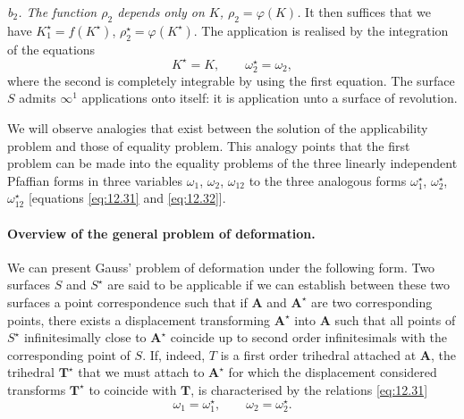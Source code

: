 \documentclass[leqno,11pt]{book}
\makeatletter
\numberwithin{equation}{chapter}
\theoremstyle{shape1}
\theoremstyle{shapesmall}
\let\old@phi\phi
\let\old@varphi\varphi
\let\phi\old@varphi
\let\varphi\old@phi
\newcommand{\str}{^{\star}}
\newcommand{\somespace}{\vspace{9pt}}
\makeatother
\begin{document}
\somespace

\emph{b$_{2}$. The function $\rho_{2}$ depends only on $K$, $\rho_{2}=\phi(K)$.}
It then suffices that we have $K\str_{1}=f(K\str)$, $\rho\str_{2}=\phi(K\str)$. The application is realised by the integration of the equations
\[
K\str=K,\qquad\omega\str_{2}=\omega_{2},
\]
where the second is completely integrable by using the first equation. The surface $S$ admits $\infty^{1}$ applications onto itself: it is application unto a surface of revolution.

\somespace

We will observe analogies that exist between the solution of the applicability problem and those of equality problem. This analogy points that the first problem can be made into the equality problems of the three linearly independent Pfaffian forms in three variables $\omega_{1}$, $\omega_{2}$, $\omega_{12}$ to the three analogous forms $\omega\str_{1}$, $\omega\str_{2}$, $\omega\str_{12}$ [equations \eqref{eq:12.31} and \eqref{eq:12.32}].

\paragraph{Overview of the general problem of deformation.}
\label{sec:196}
We can present Gauss' problem of deformation under the following form. Two surfaces $S$ and $S\str$ are said to be applicable if we can establish between these two surfaces a point correspondence such that if $\mathbf{A}$ and $\mathbf{A}\str$ are two corresponding points, there exists a displacement transforming $\mathbf{A}\str$ into $\mathbf{A}$ such that all points of $S\str$ infinitesimally close to $\mathbf{A}\str$ coincide up to second order infinitesimals with the corresponding point of $S$. If, indeed, $T$ is a first order trihedral attached at $\mathbf{A}$, the trihedral $\mathbf{T}\str$ that we must attach to $\mathbf{A}\str$ for which the displacement considered transforms $\mathbf{T}\str$ to coincide with $\mathbf{T}$, is characterised by the relations \eqref{eq:12.31}
\[
\omega_{1}=\omega_{1}\str,\qquad\omega_{2}=\omega_{2}\str.
\]
\end{document}

